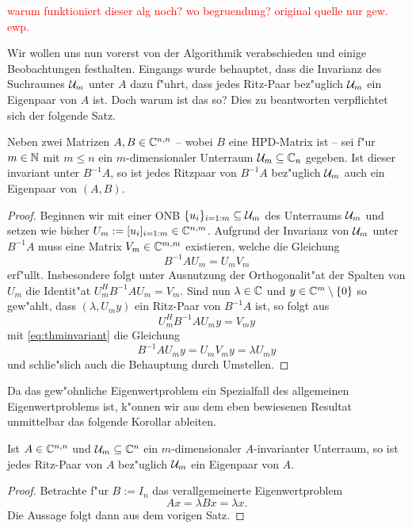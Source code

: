 \textcolor{red}{warum funktioniert dieser alg noch? wo begruendung? original quelle nur gew. ewp.}

Wir wollen uns nun vorerst von der Algorithmik verabschieden und einige Beobachtungen
festhalten. Eingangs wurde behauptet, dass die Invarianz des Suchraumes $\mathcal{U}_m$ unter
$A$ dazu f"uhrt, dass jedes Ritz-Paar bez"uglich $\mathcal{U}_m$ ein Eigenpaar von $A$ ist.
Doch warum ist das so? Dies zu beantworten verpflichtet sich der folgende Satz.

\begin{thm}\label{thm:invariant}
Neben zwei Matrizen $A,B\in\mathbb{C}^{n,n}$ -- wobei $B$ eine HPD-Matrix ist -- sei f"ur
$m\in\mathbb{N}$ mit $m\le n$ ein $m$-dimensionaler Unterraum $\mathcal{U}_m \subseteq \mathbb{C}_n$ gegeben.
Ist dieser invariant unter $B^{-1}A$, so ist jedes Ritzpaar von $B^{-1}A$
bez"uglich $\mathcal{U}_m$ auch ein Eigenpaar von $(A,B)$.
\end{thm}

\begin{proof}
Beginnen wir mit einer ONB $\{u_i\}_{i=1:m}\subseteq\mathcal{U}_m$ des Unterraums $\mathcal{U}_m$
und setzen wie bisher $U_m := [u_i]_{i=1:m}\in\mathbb{C}^{n,m}$. Aufgrund der Invarianz
von $\mathcal{U}_m$ unter $B^{-1}A$ muss eine Matrix $V_m \in \mathbb{C}^{m,m}$ existieren, welche
die Gleichung
\begin{equation}\label{eq:thminvariant}
B^{-1}A U_m = U_m V_m
\end{equation}
erf"ullt. Insbesondere folgt unter Ausnutzung der Orthogonalit"at der Spalten
von $U_m$ die Identit"at $U_m^H B^{-1}A U_m = V_m$.
Sind nun $\lambda\in\mathbb{C}$ und $y\in\mathbb{C}^m\setminus\{0\}$ so gew"ahlt, dass $(\lambda, U_m y)$
ein Ritz-Paar von $B^{-1}A$ ist, so folgt aus
\[
U_m^H B^{-1}A U_m y = V_m y
\]
mit \eqref{eq:thminvariant} die Gleichung
\[
B^{-1}AU_m y = U_m V_m y = \lambda U_m y
\]
und schlie"slich auch die Behauptung durch Umstellen.
\end{proof}

Da das gew"ohnliche Eigenwertproblem ein Spezialfall des allgemeinen Eigenwertproblems
ist, k"onnen wir aus dem eben bewiesenen Resultat unmittelbar das folgende Korollar
ableiten.

\begin{kor}
Ist $A\in\mathbb{C}^{n,n}$ und $\mathcal{U}_m\subseteq \mathbb{C}^n$ ein $m$-dimensionaler $A$-invarianter Unterraum, so ist
jedes Ritz-Paar von $A$ bez"uglich $\mathcal{U}_m$ ein Eigenpaar von $A$.
\end{kor}

\begin{proof}
Betrachte f"ur $B:=I_n$ das verallgemeinerte Eigenwertproblem
\[
Ax = \lambda Bx = \lambda x.
\]
Die Aussage folgt dann aus dem vorigen Satz.
\end{proof}

